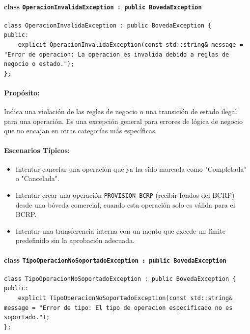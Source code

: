 \documentclass{article}
\newcommand{\inlinecode}[1]{\texttt{#1}}
\begin{document}
\paragraph*{\textbf{class \inlinecode{OperacionInvalidaException : public BovedaException}}}
\vspace{2mm} %
\begin{lstlisting}
class OperacionInvalidaException : public BovedaException {
public:
    explicit OperacionInvalidaException(const std::string& message = "Error de operacion: La operacion es invalida debido a reglas de negocio o estado.");
};
\end{lstlisting}
\paragraph*{Propósito:} Indica una violaci\'on de las reglas de negocio o una transici\'on de estado ilegal para una operaci\'on. Es una excepci\'on general para errores de l\'ogica de negocio que no encajan en otras categor\'ias m\'as espec\'ificas.

\paragraph*{Escenarios Típicos:}
\begin{itemize}
    \item Intentar cancelar una operaci\'on que ya ha sido marcada como "Completada" o "Cancelada".
    \item Intentar crear una operaci\'on \inlinecode{PROVISION\_BCRP} (recibir fondos del BCRP) desde una b\'oveda comercial, cuando esta operaci\'on solo es v\'alida para el BCRP.
    \item Intentar una transferencia interna con un monto que excede un l\'imite predefinido sin la aprobaci\'on adecuada.
\end{itemize}

\paragraph*{\textbf{class \inlinecode{TipoOperacionNoSoportadoException : public BovedaException}}}
\vspace{2mm} %
\begin{lstlisting}
class TipoOperacionNoSoportadoException : public BovedaException {
public:
    explicit TipoOperacionNoSoportadoException(const std::string& message = "Error de tipo: El tipo de operacion especificado no es soportado.");
};
\end{lstlisting}
\end{document}
